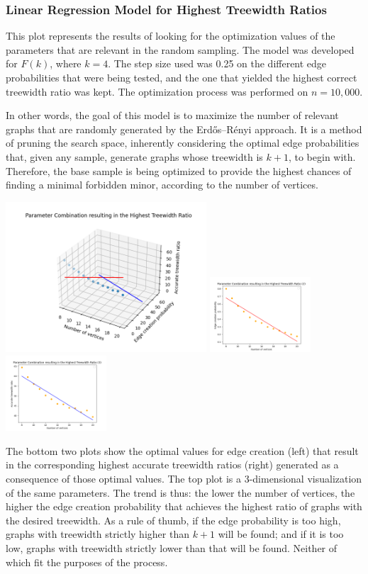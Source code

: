 \subsubsection{Linear Regression Model for Highest Treewidth Ratios}
This plot represents the results of looking for the optimization values of the parameters that are relevant in the random sampling. The model was developed for $F(k)$, where $k=4$. The step size used was 0.25 on the different edge probabilities that were being tested, and the one that yielded the highest correct treewidth ratio was kept. The optimization process was performed on $n=10,000$.

In other words, the goal of this model is to maximize the number of relevant graphs that are randomly generated by the Erdős–Rényi approach. It is a method of pruning the search space, inherently considering the optimal edge probabilities that, given any sample, generate graphs whose treewidth is $k+1$, to begin with. Therefore, the base sample is being optimized to provide the highest chances of finding a minimal forbidden minor, according to the number of vertices. 

\includegraphics[width=7.5cm]{images/tw_ratio_3d.png}
\includegraphics[width=3.75cm]{images/tw_ratio_2d_edge.png}
\includegraphics[width=3.75cm]{images/tw_ratio_2d_tw.png}

The bottom two plots show the optimal values for edge creation (left) that result in the corresponding highest accurate treewidth ratios (right) generated as a consequence of those optimal values. The top plot is a 3-dimensional visualization of the same parameters. The trend is thus: the lower the number of vertices, the higher the edge creation probability that achieves the highest ratio of graphs with the desired treewidth. As a rule of thumb, if the edge probability is too high, graphs with treewidth strictly higher than $k+1$ will be found; and if it is too low, graphs with treewidth strictly lower than that will be found. Neither of which fit the purposes of the process.

